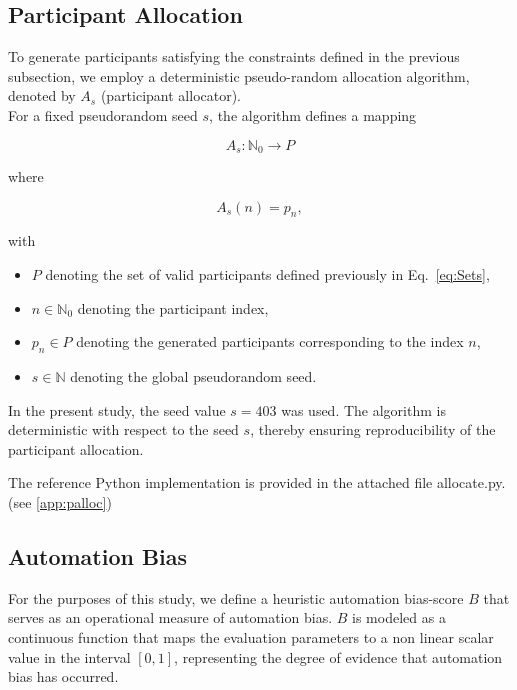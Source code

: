 \documentclass[sigconf,natbib=false]{acmart}
\begin{document}
\subsection{Participant Allocation}
\label{sec:participant-allocation}

To generate participants satisfying the constraints defined in the
previous subsection, we employ a deterministic pseudo-random allocation
algorithm, denoted by \(A_s\) (participant allocator).\\
For a fixed \gls{pseudorandom seed} \(s\), the algorithm defines a mapping

\begin{equation*}
A_s : \mathbb{N}_0 \to P
\end{equation*}

where

\begin{equation}
A_s(n) = p_n,
\label{eq:A}
\end{equation}

with

\begin{itemize}
    \item \(P\) denoting the set of valid participants defined previously in Eq.~\eqref{eq:Sets},
    \item \(n \in \mathbb{N}_0\) denoting the participant index,
    \item \(p_n \in P\) denoting the generated participants corresponding to the index \(n\),
    \item \(s \in \mathbb{N}\) denoting the global \gls{pseudorandom seed}.
\end{itemize}

In the present study, the seed value \(s = 403\) was used.
The algorithm is deterministic with respect to the seed \(s\), thereby ensuring reproducibility of the participant allocation.

The reference Python implementation is provided in the attached file allocate.py.
(see \ref{app:palloc})

\subsection{Automation Bias}
\label{sec:automation-bias}

For the purposes of this study, we define a heuristic automation bias-score $B$ that serves as an operational measure of automation bias.
$B$ is modeled as a continuous function that maps the evaluation parameters to a non linear scalar value in the interval $[0,1]$, representing the degree of evidence that automation bias has occurred.
\end{document}
